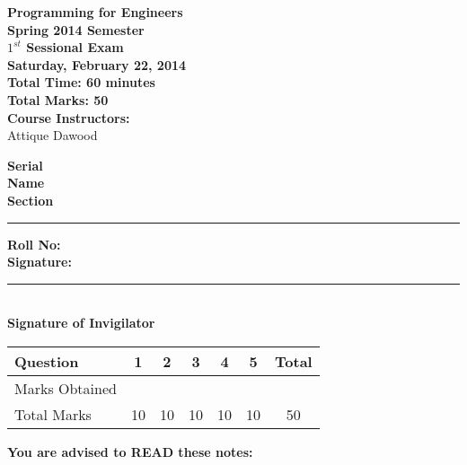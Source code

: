 \documentclass[12pt,a4paper]{article}
\def\QOne{10}
\def\Qtwo{10}
\def\Qthree{10}
\def\Qfour{10}
\def\Qfive{10}
\def\TotalMarks{50}
\begin{document}
\begin{minipage}{0.55\textwidth}
{\LARGE \textbf{Programming for Engineers}}\\[0.15cm]
{\normalsize \textbf{Spring 2014 Semester}}\\
{\Large \textbf{$1^{st}$ Sessional Exam}}\\
{\normalsize \textbf{Saturday, February 22, 2014}}\\[0.30cm]
{\Large \textbf{Total Time: 60 minutes}}\\[0.15cm]
{\Large \textbf{Total Marks: 50}}\\
\textbf{Course Instructors:}\\
Attique Dawood\\
\end{minipage}
\begin{minipage}{0.4\textwidth}
\textbf{Serial} \hrulefill \\[0.25cm]
\textbf{Name} \hrulefill\\[0.25cm]
\textbf{Section} \rule{1cm}{0.2mm} \textbf{Roll No:} \hrulefill\\[0.25cm]
\textbf{Signature:} \hrulefill\\[0.25cm]
\rule{6.6cm}{0.2mm}\\
\textbf{Signature of Invigilator}\\[0.25cm]
\end{minipage}
\begin{table}[H]
\begin{center}
\vspace{0.3cm}
	{\large \begin{tabular}{|l|c|c|c|c|c|c|}
	\hline
		\rule{0pt}{2.6ex} Question & \textbf{1} & \textbf{2} & \textbf{3} & \textbf{4} & \textbf{5} & \textbf{Total}\\
		\hline
		Marks Obtained \rule{0pt}{2.6ex} & & & & & &\\
		\hline
		Total Marks \rule{0pt}{2.6ex} & \QOne & \Qtwo & \Qthree & \Qfour & \Qfive & \TotalMarks\\
	\hline
	\end{tabular}}
\end{center}
\end{table}
\noindent \textbf{You are advised to READ these notes:}
\end{document}
